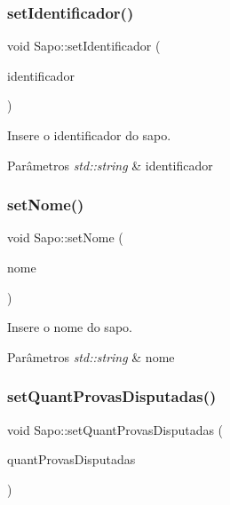 \subsubsection{\texorpdfstring{set\+Identificador()}{setIdentificador()}}
{\footnotesize\ttfamily void Sapo\+::set\+Identificador (\begin{DoxyParamCaption}\item[{std\+::string}]{identificador }\end{DoxyParamCaption})}



Insere o identificador do sapo. 


\begin{DoxyParams}{Parâmetros}
{\em std\+::string} & identificador \\
\hline
\end{DoxyParams}
\mbox{\label{classSapo_aacafe6399f877e9bda12c146531fe31f}} 
\subsubsection{\texorpdfstring{set\+Nome()}{setNome()}}
{\footnotesize\ttfamily void Sapo\+::set\+Nome (\begin{DoxyParamCaption}\item[{std\+::string}]{nome }\end{DoxyParamCaption})}



Insere o nome do sapo. 


\begin{DoxyParams}{Parâmetros}
{\em std\+::string} & nome \\
\hline
\end{DoxyParams}
\mbox{\label{classSapo_aa6cc2e207994cbf0e1ad2239744602eb}} 
\subsubsection{\texorpdfstring{set\+Quant\+Provas\+Disputadas()}{setQuantProvasDisputadas()}}
{\footnotesize\ttfamily void Sapo\+::set\+Quant\+Provas\+Disputadas (\begin{DoxyParamCaption}\item[{int}]{quant\+Provas\+Disputadas }\end{DoxyParamCaption})}




